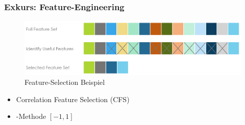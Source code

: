 \documentclass{beamer}
\begin{document}
\begin{frame}
  \frametitle{Exkurs: Feature-Engineering}

  \begin{figure}
    \centering
    \includegraphics[width=\textwidth]{images/feature_engineering.png}
    \caption*{Feature-Selection Beispiel \cite{Medium2019}}
  \end{figure}

  \begin{itemize}
    \item Correlation Feature Selection (\textsc{CFS})
    \item {}-Methode $[-1, 1]$
  \end{itemize}  
\end{frame}
\end{document}

